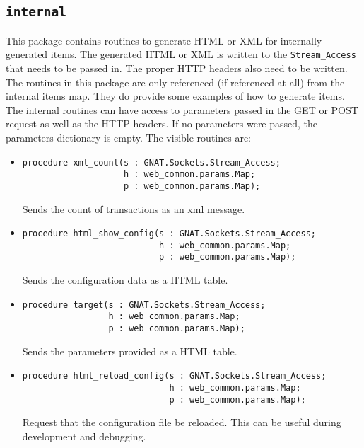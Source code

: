 \documentclass[10pt, openany, draft]{article}
\begin{document}
\subsection{\texttt{internal}}
This package contains routines to generate HTML or XML for internally generated items.  The generated HTML or XML is written to the \texttt{Stream\_Access} that needs to be passed in.  The proper HTTP headers also need to be written.  The routines in this package are only referenced (if referenced at all) from the internal items map.  They do provide some examples of how to generate items.  The internal routines can have access to parameters passed in the GET or POST request as well as the HTTP headers.  If no parameters were passed, the parameters dictionary is empty.  The visible routines are:
\begin{itemize}
  \item \begin{verbatim}
procedure xml_count(s : GNAT.Sockets.Stream_Access;
                    h : web_common.params.Map;
                    p : web_common.params.Map);
\end{verbatim}
  Sends the count of transactions as an xml message.
  \item \begin{verbatim}
procedure html_show_config(s : GNAT.Sockets.Stream_Access;
                           h : web_common.params.Map;
                           p : web_common.params.Map);
\end{verbatim}
  Sends the configuration data as a HTML table.
  \item \begin{verbatim}
procedure target(s : GNAT.Sockets.Stream_Access;
                 h : web_common.params.Map;
                 p : web_common.params.Map);
\end{verbatim}
  Sends the parameters provided as a HTML table.
  \item \begin{verbatim}
procedure html_reload_config(s : GNAT.Sockets.Stream_Access;
                             h : web_common.params.Map;
                             p : web_common.params.Map);
\end{verbatim}
  Request that the configuration file be reloaded.  This can be useful during development and debugging.
\end{itemize}
\end{document}
